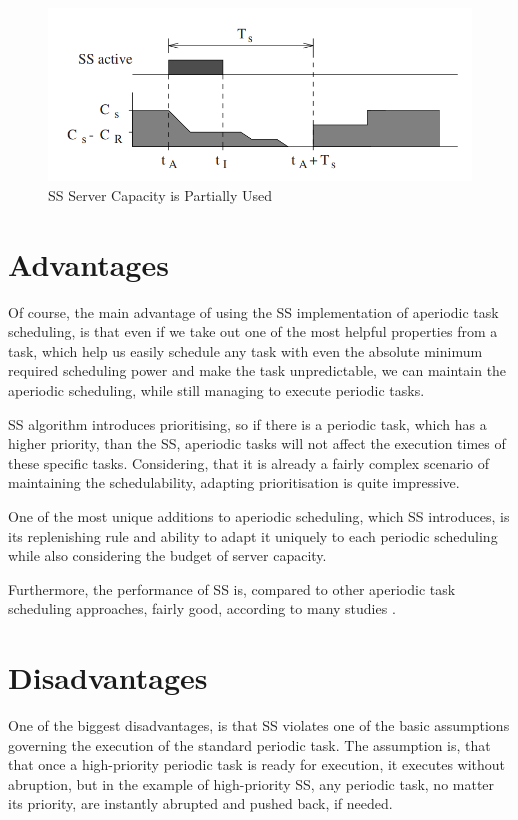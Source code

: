 \documentclass[conference]{IEEEtran}
\begin{document}
\begin{figure}[htbp]
\centerline{\includegraphics[scale=.39]{reinterpretation_partial_capacity.png}}
\caption{SS Server Capacity is Partially Used \cite{b1}}
\label{rein3}
\end{figure}

\section{Advantages}
Of course, the main advantage of using the SS implementation of aperiodic task scheduling, is that even if we take out one of the most helpful properties from a task, which help us easily schedule any task with even the absolute minimum required scheduling power and make the task unpredictable, we can maintain the aperiodic scheduling, while still managing to execute periodic tasks.

SS algorithm introduces prioritising, so if there is a periodic task, which has a higher priority, than the SS, aperiodic tasks will not affect the execution times of these specific tasks. Considering, that it is already a fairly complex scenario of maintaining the schedulability, adapting prioritisation is quite impressive.

One of the most unique additions to aperiodic scheduling, which SS introduces, is its replenishing rule and ability to adapt it uniquely to each periodic scheduling while also considering the budget of server capacity.

Furthermore, the performance of SS is, compared to other aperiodic task scheduling approaches, fairly good, according to many studies \cite{b3}.

\section{Disadvantages}
One of the biggest disadvantages, is that SS violates one of the basic assumptions governing the execution of the standard periodic task. The assumption is, that that once a high-priority periodic task is ready for execution, it executes without abruption, but in the example of high-priority SS, any periodic task, no matter its priority, are instantly abrupted and pushed back, if needed.
\end{document}
